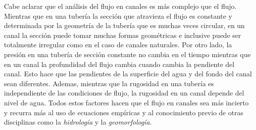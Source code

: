 \documentclass[11pt, oneside]{article}
\begin{document}
Cabe aclarar que el an\'alisis del flujo en canales es m\'as complejo que el flujo. Mientras que en una tuber\'ia la secci\'on que atravieza el flujo es constante y determinada por la geometr\'ia de la tuber\'ia que es muchas veces circular, en un canal la secci\'on puede tomar muchas formas geom\'etricas e inclusive puede ser totalmente irregular como en el caso de canales naturales. Por otro lado, la presi\'on en una tuber\'ia de secci\'on constante no cambia en el tiempo mientras que en un canal la profundidad  del flujo cambia cuando cambia la pendiente del canal. Esto hace que las pendientes de la superficie del agua y del fondo del canal sean diferentes. Ademas, mientras que la rugosidad en una tuber\'ia es independiente de las condiciones de flujo, la rugosidad en un canal depende del nivel de agua. Todos estos factores hacen que el flujo en canales sea m\'as incierto y recurra m\'as al uso de ecuaciones emp\'iricas y al conocimiento previo de otras disciplinas como la \emph{hidrolog\'ia} y la \emph{geomorfolog\'ia}.
\end{document}
